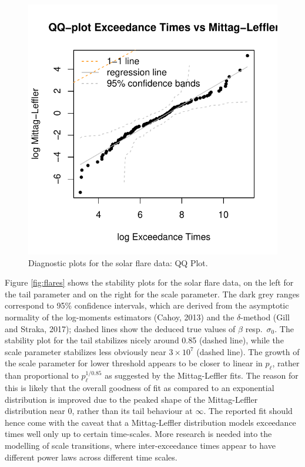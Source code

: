 \documentclass[]{elsarticle} %
\begin{document}
\begin{figure}

{\centering \includegraphics[width=0.7\linewidth]{article_springer_files/figure-latex/flare-diagnostics-3-1} 

}

\caption{\label{fig:flare-diagnostics-3} Diagnostic plots for the solar flare data: QQ Plot.}\label{fig:flare-diagnostics-3}
\end{figure}

Figure \ref{fig:flares} shows the stability plots for the solar flare
data, on the left for the tail parameter and on the right for the scale
parameter. The dark grey ranges correspond to 95\% confidence intervals,
which are derived from the asymptotic normality of the log-moments
estimators (Cahoy, 2013) and the \(\delta\)-method (Gill and Straka,
2017); dashed lines show the deduced true values of \(\beta\)
resp.~\(\sigma_0\). The stability plot for the tail stabilizes nicely
around 0.85 (dashed line), while the scale parameter stabilizes less
obviously near \(3 \times 10^7\) (dashed line). The growth of the scale
parameter for lower threshold appears to be closer to linear in
\(p_{\ell}\), rather than proportional to \(p_{\ell}^{1/0.85}\) as
suggested by the Mittag-Leffler fits. The reason for this is likely that
the overall goodness of fit as compared to an exponential distribution
is improved due to the peaked shape of the Mittag-Leffler distribution
near \(0\), rather than its tail behaviour at \(\infty\). The reported
fit should hence come with the caveat that a Mittag-Leffler distribution
models exceedance times well only up to certain time-scales. More
research is needed into the modelling of scale transitions, where
inter-exceedance times appear to have different power laws across
different time scales.
\end{document}
